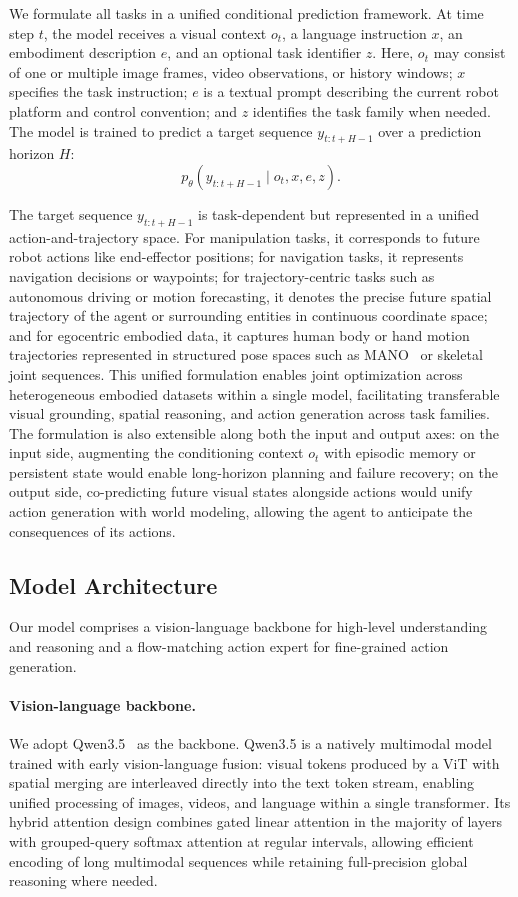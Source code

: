 \documentclass{llmxive}
\begin{document}
We formulate all tasks in a unified conditional prediction framework. At time step $t$, the model receives a visual context $o_{t}$, a language instruction $x$, an embodiment description $e$, and an optional task identifier $z$. Here, $o_{t}$ may consist of one or multiple image frames, video observations, or history windows; $x$ specifies the task instruction; $e$ is a textual prompt describing the current robot platform and control convention; and $z$ identifies the task family when needed. The model is trained to predict a target sequence $y_{t:t+H-1}$ over a prediction horizon $H$:
\[
p_\theta(y_{t:t+H-1} \mid o_{t}, x, e, z).
\]

The target sequence $y_{t:t+H-1}$ is task-dependent but represented in a unified action-and-trajectory space. For manipulation tasks, it corresponds to future robot actions like end-effector positions; for navigation tasks, it represents navigation decisions or waypoints; for trajectory-centric tasks such as autonomous driving or motion forecasting, it denotes the precise future spatial trajectory of the agent or surrounding entities in continuous coordinate space; and for egocentric embodied data, it captures human body or hand motion trajectories represented in structured pose spaces such as MANO~\citep{MANO} or skeletal joint sequences. This unified formulation enables joint optimization across heterogeneous embodied datasets within a single model, facilitating transferable visual grounding, spatial reasoning, and action generation across task families. The formulation is also extensible along both the input and output axes: on the input side, augmenting the conditioning context $o_{t}$ with episodic memory or persistent state would enable long-horizon planning and failure recovery; on the output side, co-predicting future visual states alongside actions would unify action generation with world modeling, allowing the agent to anticipate the consequences of its actions. 
\subsection{Model Architecture}
\label{sec:architecture}

Our model comprises a vision-language backbone for high-level understanding and reasoning and a flow-matching action expert for fine-grained action generation.

\paragraph{Vision-language backbone.}
We adopt Qwen3.5~\citep{qwen35blog} as the backbone. Qwen3.5 is a natively multimodal model trained with early vision-language fusion: visual tokens produced by a ViT with spatial merging are interleaved directly into the text token stream, enabling unified processing of images,
videos, and language within a single transformer.
Its hybrid attention design combines gated linear attention in the majority of layers with grouped-query softmax attention at regular intervals, allowing
efficient encoding of long multimodal sequences while retaining full-precision global reasoning where needed.
\end{document}
